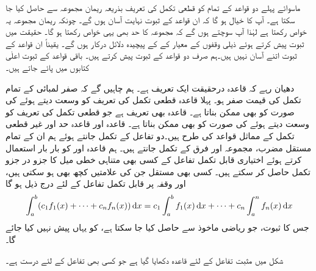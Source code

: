 ماسوائے پہلے دو قواعد کے تمام  کو قطعی تکمل کی تعریف بذریعہ ریمان مجموعہ سے حاصل کیا جا سکتا ہے۔ آپ کا خیال ہو گا کہ  ان قواعد کے ثبوت نہایت آسان ہوں گے۔ چونکہ ریمان مجموعہ یہ خواص رکھتا ہے لہٰذا آپ سوچتے ہوں گے کہ مجموعہ کا حد بھی یہی خواص رکھتا ہو گا۔ حقیقت میں  ثبوت پیش کرتے ہوئے ذیلی وقفوں کے معیار کے  کے پیچیدہ دلائل درکار ہوں گے۔ یقیناً ان قواعد کے ثبوت اتنے آسان نہیں ہیں۔ہم صرف دو قواعد کے ثبوت پیش کرتے ہیں۔ باقی قواعد کے ثبوت  اعلٰی کتابوں میں پائے جاتے ہیں۔

دھیان رہے کہ قاعدہ  درحقیقت ایک تعریف ہے۔ ہم چاہیں گے کہ صفر لمبائی کے تمام تکمل کی قیمت صفر ہو۔ پہلا قاعدہ قطعی تکمل کی تعریف کو وسعت دیتے ہوئے   کی صورت کو بھی ممکن بناتا ہے۔ قاعدہ  بھی تعریف ہے جو قطعی تکمل کی تعریف کو وسعت دیتے ہوئے  کی صورت کو بھی ممکن بناتا ہے۔ قاعدہ  اور قاعدہ  حد اور غیر قطعی تکمل کے مماثل قواعد کی طرح ہیں۔دو تفاعل کے تکمل جانتے ہوئے ہم ان کے تمام مستقل مضرب، مجموعہ اور فرق  کے تکمل جانتے ہیں۔ ہم قاعدہ  اور  کو بار بار استعمال کرتے ہوئے اختیاری قابل تکمل تفاعل کے کسی بھی  متناہی خطی میل کا جزو در جزو تکمل حاصل کر سکتے ہیں۔ کسی بھی مستقل  جن کی علامتیں کچھ بھی ہو سکتی ہیں، اور وقفہ  پر قابل تکمل تفاعل  کے لئے درج ذیل ہو گا
\begin{align*}
\int_a^b(c_1f_1(x)+\cdots+c_nf_n(x))\dif x=c_1\int_a^bf_1(x)\dif x+\cdots+c_n\int_a^nf_n(x)\dif x
\end{align*}  
جس کا ثبوت، جو ریاضی ماخوذ سے حاصل کیا جا سکتا ہے، کو یہاں پیش نہیں کیا جائے گا۔

شکل  میں مثبت تفاعل کے لئے قاعدہ  دکھایا گیا ہے جو کسی بھی تفاعل کے لئے درست ہے۔

